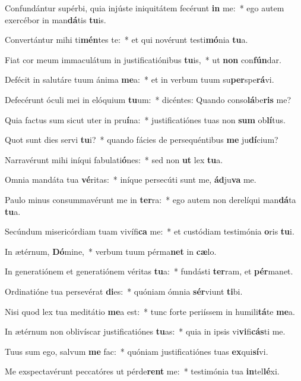 \item Confundántur supérbi, quia injúste iniquitátem fecérunt \textbf{in} me:~* ego autem exercébor in man\textbf{dá}tis \textbf{tu}is.
\item Convertántur mihi ti\textbf{mén}tes te:~* et qui novérunt testi\textbf{mó}nia \textbf{tu}a.
\item Fiat cor meum immaculátum in justificatiónibus \textbf{tu}is,~* ut \textbf{non} con\textbf{fún}dar.
\item Defécit in salutáre tuum ánima \textbf{me}a:~* et in verbum tuum su\textbf{per}spe\textbf{rá}vi.
\item Defecérunt óculi mei in elóquium \textbf{tu}um:~* dicéntes: Quando conso\textbf{lá}be\textbf{ris} me?
\item Quia factus sum sicut uter in pru\textbf{í}na:~* justificatiónes tuas non \textbf{sum} ob\textbf{lí}tus.
\item Quot sunt dies servi \textbf{tu}i?~* quando fácies de persequéntibus \textbf{me} ju\textbf{dí}cium?
\item Narravérunt mihi iníqui fabulati\textbf{ó}nes:~* sed non \textbf{ut} lex \textbf{tu}a.
\item Omnia mandáta tua \textbf{vé}ritas:~* iníque persecúti sunt me, \textbf{ád}ju\textbf{va} me.
\item Paulo minus consummavérunt me in \textbf{ter}ra:~* ego autem non derelíqui man\textbf{dá}ta \textbf{tu}a.
\item Secúndum misericórdiam tuam vivífi\textbf{ca} me:~* et custódiam testimónia \textbf{o}ris \textbf{tu}i.
\item In ætérnum, \textbf{Dó}mine,~* verbum tuum pérma\textbf{net} in \textbf{cæ}lo.
\item In generatiónem et generatiónem véritas \textbf{tu}a:~* fundásti \textbf{ter}ram, et \textbf{pér}manet.
\item Ordinatióne tua persevérat \textbf{di}es:~* quóniam ómnia \textbf{sér}viunt \textbf{ti}bi.
\item Nisi quod lex tua meditátio \textbf{me}a est:~* tunc forte periíssem in humili\textbf{tá}te \textbf{me}a.
\item In ætérnum non oblivíscar justificatiónes \textbf{tu}as:~* quia in ipsis vi\textbf{vi}fi\textbf{cás}ti me.
\item Tuus sum ego, salvum \textbf{me} fac:~* quóniam justificatiónes tuas \textbf{ex}qui\textbf{sí}vi.
\item Me exspectavérunt peccatóres ut pérde\textbf{rent} me:~* testimónia tua \textbf{in}tel\textbf{lé}xi.
